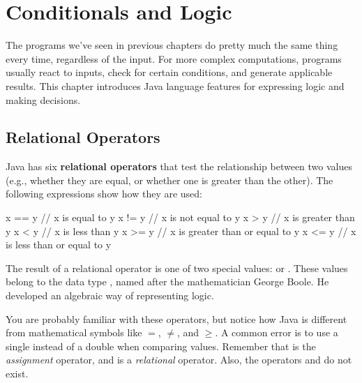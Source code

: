 \chapter{Conditionals and Logic}


The programs we've seen in previous chapters do pretty much the same thing every time, regardless of the input.
For more complex computations, programs usually react to inputs, check for certain conditions, and generate applicable results.
This chapter introduces Java language features for expressing logic and making decisions.


\section{Relational Operators}


Java has six {\bf relational operators} that test the relationship between two values (e.g., whether they are equal, or whether one is greater than the other).
The following expressions show how they are used:

\begin{code}
x == y          // x is equal to y
x != y          // x is not equal to y
x > y           // x is greater than y
x < y           // x is less than y
x >= y          // x is greater than or equal to y
x <= y          // x is less than or equal to y
\end{code}


The result of a relational operator is one of two special values:  or .
These values belong to the data type , named after the mathematician George Boole.
He developed an algebraic way of representing logic.


You are probably familiar with these operators, but notice how Java is different from mathematical symbols like $=$, $\neq$, and $\geq$.
A common error is to use a single \java{=} instead of a double \java{==} when comparing values.
Remember that \java{=} is the {\em assignment} operator, and \java{==} is a {\em relational} operator.
Also, the operators \java{=<} and \java{=>} do not exist.


